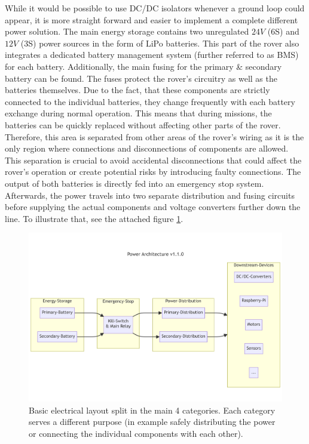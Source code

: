     While it would be possible to use DC/DC isolators whenever a ground loop could appear, it is more straight forward and easier to implement a complete different power solution. The main energy storage contains two unregulated $24V$ (6S) and $12V$ (3S) power sources in the form of LiPo batteries. This part of the rover also integrates a dedicated battery management system (further referred to as BMS) for each battery. Additionally, the main fusing for the primary \& secondary battery can be found. The fuses protect the rover's circuitry as well as the batteries themselves. Due to the fact, that these components are strictly connected to the individual batteries, they change frequently with each battery exchange during normal operation. This means that during missions, the batteries can be quickly replaced without affecting other parts of the rover. Therefore, this area is separated from other areas of the rover's wiring as it is the only region where connections and disconnections of components are allowed. This separation is crucial to avoid accidental disconnections that could affect the rover's operation or create potential risks by introducing faulty connections. The output of both batteries is directly fed into an emergency stop system. Afterwards, the power travels into two separate distribution and fusing circuits before supplying the actual components and voltage converters further down the line. To illustrate that, see the attached figure \ref{power_architecture}.
    
    \begin{figure}[h]
    \includegraphics[width=\textwidth]{contents/figures/power-architecture-v1.1.0.png}
    \caption{Basic electrical layout split in the main 4 categories. Each category serves a different purpose (in example safely distributing the power or connecting the individual components with each other).}
    \label{power_architecture}
    \end{figure}

